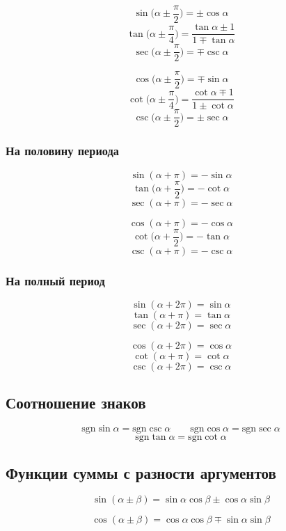\documentclass[
  letterpaper,
  DIV=11,
  numbers=noendperiod]{scrreprt}
\newcommand{\sgn}{\mathrm{sgn}}
\theoremstyle{definition}
\theoremstyle{remark}
\begin{document}
\[\sin \Big(\alpha \pm \frac{\pi}{2}\Big) = \pm\cos \alpha\]
\[\tan \Big(\alpha \pm \frac{\pi}{4}\Big) = \frac{\tan \alpha \pm 1}{1 \mp \tan \alpha}\]
\[\sec \Big(\alpha \pm \frac{\pi}{2}\Big) = \mp \csc \alpha\]

\[\cos \Big(\alpha \pm \frac{\pi}{2}\Big) = \mp \sin \alpha\]
\[\cot \Big(\alpha \pm \frac{\pi}{4}\Big) = \frac{\cot \alpha \mp 1}{1 \pm \cot \alpha}\]
\[\csc \Big(\alpha \pm \frac{\pi}{2}\Big) = \pm \sec \alpha\]

\subsubsection{На половину периода}\label{trig_shift_by_half}

\[\sin (\alpha + \pi) = -\sin \alpha\]
\[\tan \Big(\alpha + \frac{\pi}{2}\Big) = -\cot \alpha\]
\[\sec (\alpha + \pi) = -\sec \alpha\]

\[\cos (\alpha + \pi) = -\cos \alpha\]
\[\cot \Big(\alpha + \frac{\pi}{2}\Big) = -\tan \alpha\]
\[\csc (\alpha + \pi) = -\csc \alpha\]

\subsubsection{На полный период}\label{trig_shift_by_full}

\[\sin (\alpha + 2\pi) = \sin \alpha\]
\[\tan (\alpha + \pi) = \tan \alpha\]
\[\sec (\alpha + 2\pi) = \sec \alpha\]

\[\cos (\alpha + 2\pi) = \cos \alpha\]
\[\cot (\alpha + \pi) = \cot \alpha\]
\[\csc (\alpha + 2\pi) = \csc \alpha\]

\subsection{Соотношение знаков}\label{trig_sgn}

\[
\sgn \sin \alpha = \sgn \csc \alpha \qquad \sgn \cos \alpha = \sgn \sec \alpha
\] \[
\sgn \tan \alpha = \sgn \cot \alpha
\]

\subsection{Функции суммы с разности аргументов}\label{trig_angle_sum}

\[
\sin (\alpha \pm \beta) = \sin \alpha \cos \beta \pm \cos \alpha \sin \beta
\]

\[
\cos (\alpha \pm \beta) = \cos \alpha \cos \beta \mp \sin \alpha \sin \beta
\]
\end{document}
